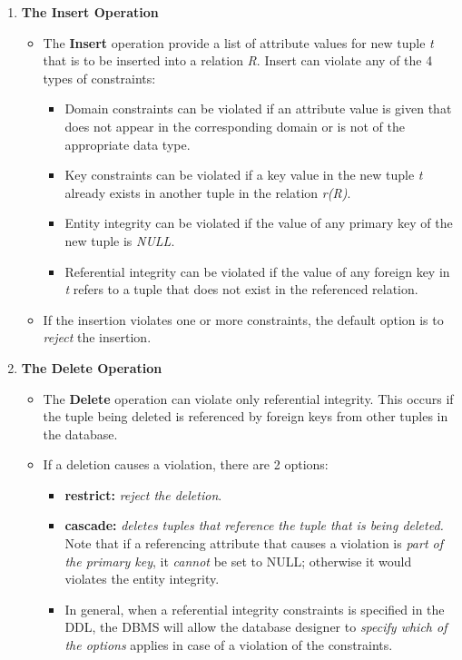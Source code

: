 \documentclass[10pt]{article}
\newcommand{\tf}{\textbf}
\newcommand{\ti}{\textit}
\begin{document}
\begin{enumerate}
	\item \tf{The Insert Operation}
	\begin{itemize}
		\item The \tf{Insert} operation provide a list of attribute values for new tuple \ti{t} that is to be inserted into a relation \ti{R}. Insert can violate any of the 4 types of constraints:
		\begin{itemize}
			\item Domain constraints can be violated if an attribute value is given that does not appear in the corresponding domain or is not of the appropriate data type.
			\item Key constraints can be violated if a key value in the new tuple \ti{t} already exists in another tuple in the relation \ti{r(R)}.
			\item Entity integrity can be violated if the value of any primary key of the new tuple is \ti{NULL}.
			\item Referential integrity can be violated if the value of any foreign key in \ti{t} refers to a tuple that does not exist in the referenced relation.
		\end{itemize}

		\item If the insertion violates one or more constraints, the default option is to \ti{reject} the insertion.
	\end{itemize}

	\item \tf{The Delete Operation}
	\begin{itemize}
		\item The \tf{Delete} operation can violate only referential integrity. This occurs if the tuple being deleted is referenced by foreign keys from other tuples in the database.
		\item If a deletion causes a violation, there are 2 options:
		\begin{itemize}
			\item \tf{restrict:} \ti{reject the deletion}.
			\item \tf{cascade:} \ti{deletes tuples that reference the tuple that is being deleted.} Note that if a referencing attribute that causes a violation is \ti{part of the primary key}, it \ti{cannot} be set to NULL; otherwise it would violates the entity integrity.
			\item In general, when a referential integrity constraints is specified in the DDL, the DBMS will allow the database designer to \ti{specify which of the options} applies in case of a violation of the constraints. 
		\end{itemize}
	\end{itemize}


\end{enumerate}
\end{document}
